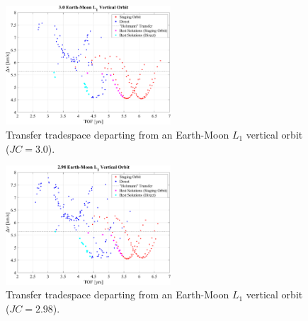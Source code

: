 \begin{figure}[ht]
    \centering
    \includegraphics[width=0.55\textwidth]{figures/TradeSpace_L1Vertical_3_00.pdf}
    \caption{Transfer tradespace departing from an Earth-Moon $L_{1}$ vertical orbit ($JC=3.0$).}
\end{figure}
\clearpage

\begin{figure}[ht]
    \centering
    \includegraphics[width=0.55\textwidth]{figures/TradeSpace_L1Vertical_2_98.pdf}
    \caption{Transfer tradespace departing from an Earth-Moon $L_{1}$ vertical orbit ($JC=2.98$).}
\end{figure}
\clearpage
